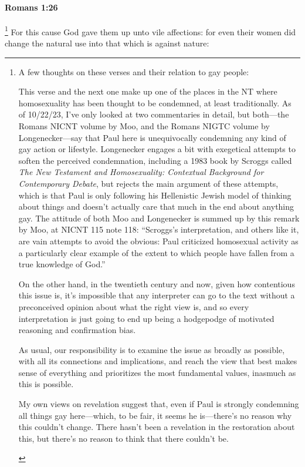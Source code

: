 		\paragraph{Romans 1:26} %
			\label{ROMANS-1-26}

				\footnote{%
					A few thoughts on these verses and their relation to gay people:
					\begin{compactitem}
						\item This verse and the next one make up one of the places in the NT where homosexuality has been thought to be condemned, at least traditionally. As of 10/22/23, I've only looked at two commentaries in detail, but both---the Romans NICNT volume by Moo, and the Romans NIGTC volume by Longenecker---say that Paul here is unequivocally condemning any kind of gay action or lifestyle. Longenecker engages a bit with exegetical attempts to soften the perceived condemnation, including a 1983 book by Scroggs called \textit{The New Testament and Homosexuality: Contextual Background for Contemporary Debate}, but rejects the main argument of these attempts, which is that Paul is only following his Hellenistic Jewish model of thinking about things and doesn't actually care that much in the end about anything gay. The attitude of both Moo and Longenecker is summed up by this remark by Moo, at NICNT 115 note 118: ``Scroggs's interpretation, and others like it, are vain attempts to avoid the obvious: Paul criticized homosexual activity as a particularly clear example of the extent to which people have fallen from a true knowledge of God.''
						\item On the other hand, in the twentieth century and now, given how contentious this issue is, it's impossible that any interpreter can go to the text without a preconceived opinion about what the right view is, and so every interpretation is just going to end up being a hodgepodge of motivated reasoning and confirmation bias.
						\item As usual, our responsibility is to examine the issue as broadly as possible, with all its connections and implications, and reach the view that best makes sense of everything and prioritizes the most fundamental values, inasmuch as this is possible.
						\item My own views on revelation suggest that, even if Paul is strongly condemning all things gay here---which, to be fair, it seems he is---there's no reason why this couldn't change. There hasn't been a revelation in the restoration about this, but there's no reason to think that there couldn't be.
					\end{compactitem}
					}%
			For this cause God gave them up unto vile affections: for even their women did change the natural use into that which is against nature:

